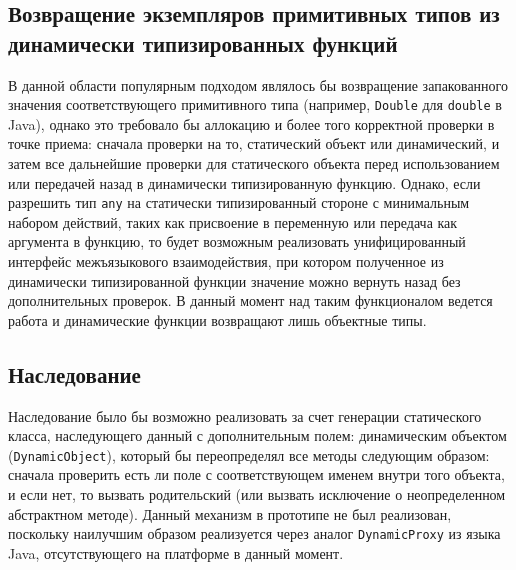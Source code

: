 \documentclass[times
]{itmo-student-thesis}
\begin{document}
\subsection{Возвращение экземпляров примитивных типов из динамически типизированных функций}
В данной области популярным подходом являлось бы возвращение запакованного значения соответствующего примитивного типа (например, \texttt{Double} для \texttt{double} в Java), однако это требовало бы аллокацию и более того корректной проверки в точке приема: сначала проверки на то, статический объект или динамический, и затем все дальнейшие проверки для статического объекта перед использованием или передачей назад в динамически типизированную функцию. Однако, если разрешить тип \texttt{any} на статически типизированный стороне с минимальным набором действий, таких как присвоение в переменную или передача как аргумента в функцию, то будет возможным реализовать унифицированный интерфейс межъязыкового взаимодействия, при котором полученное из динамически типизированной функции значение можно вернуть назад без дополнительных проверок. В данный момент над таким функционалом ведется работа и динамические функции возвращают лишь объектные типы.

\subsection{Наследование}
Наследование было бы возможно реализовать за счет генерации статического класса, наследующего данный с дополнительным полем: динамическим объектом (\texttt{DynamicObject}), который бы переопределял все методы следующим образом: сначала проверить есть ли поле с соответствующем именем внутри того объекта, и если нет, то вызвать родительский (или вызвать исключение о неопределенном абстрактном методе). Данный механизм в прототипе не был реализован, поскольку наилучшим образом реализуется через аналог \texttt{DynamicProxy} из языка Java, отсутствующего на платформе в данный момент.

\end{document}
